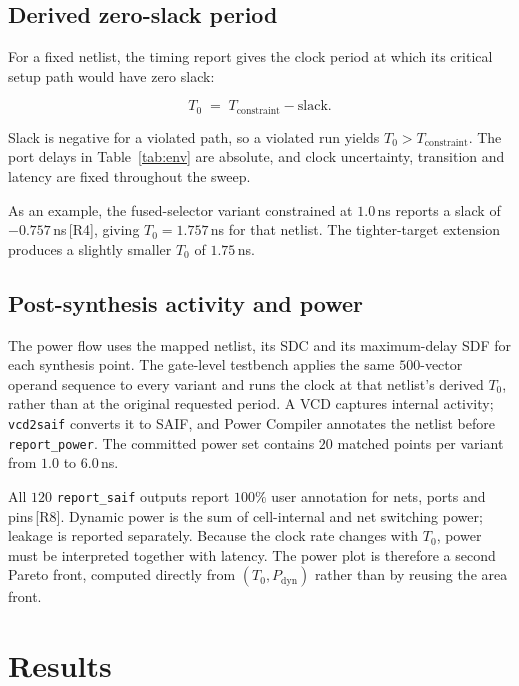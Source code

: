 \documentclass[11pt,a4paper]{article}
\newcommand{\src}[1]{\,{\footnotesize\color{accent}[#1]}}
\begin{document}
\subsection{Derived zero-slack period}
\label{sec:achieved}

For a fixed netlist, the timing report gives the clock period at which its
critical setup path would have zero slack:

\begin{equation}
T_{0} \;=\; T_{\mathrm{constraint}} - \mathrm{slack}.
\label{eq:achieved}
\end{equation}

Slack is negative for a violated path, so a violated run yields
$T_{0} > T_{\mathrm{constraint}}$. The port delays in Table~\ref{tab:env} are
absolute, and clock uncertainty, transition and latency are fixed throughout
the sweep.

As an example, the fused-selector variant constrained at $1.0$\,ns reports a
slack of $-0.757$\,ns\src{R4}, giving $T_0=1.757$\,ns for that netlist. The
tighter-target extension produces a slightly smaller $T_0$ of $1.75$\,ns.

\subsection{Post-synthesis activity and power}
\label{sec:power-method}

The power flow uses the mapped netlist, its SDC and its maximum-delay SDF for
each synthesis point. The gate-level testbench applies the same $500$-vector
operand sequence to every variant and runs the clock at that netlist's derived
$T_0$, rather than at the original requested period. A VCD captures internal
activity; \texttt{vcd2saif} converts it to SAIF, and Power Compiler annotates
the netlist before \texttt{report\_power}. The committed power set contains
$20$ matched points per variant from $1.0$ to $6.0$\,ns.

All $120$ \texttt{report\_saif} outputs report $100\%$ user annotation for
nets, ports and pins\src{R8}. Dynamic power is the sum of cell-internal and net
switching power; leakage is reported separately. Because the clock rate changes
with $T_0$, power must be interpreted together with latency. The power plot is
therefore a second Pareto front, computed directly from $(T_0,P_\mathrm{dyn})$
rather than by reusing the area front.

\section{Results}
\label{sec:results}
\end{document}
